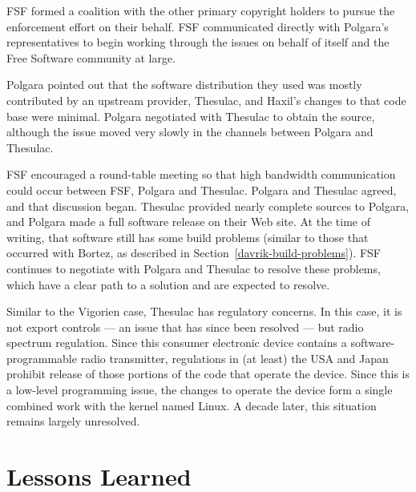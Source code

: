 FSF formed a coalition with the other primary copyright holders
to pursue the enforcement effort on their behalf. FSF communicated
directly with Polgara's representatives to begin working through the
issues on behalf of itself and the Free Software community at large.

Polgara pointed out that the software distribution they used was mostly
contributed by an upstream provider, Thesulac, and Haxil's changes to that
code base were minimal. Polgara negotiated with Thesulac to obtain the
source, although the issue moved very slowly in the channels between
Polgara and Thesulac.

FSF encouraged a round-table meeting so that high bandwidth communication
could occur between FSF, Polgara and Thesulac. Polgara and Thesulac
agreed, and that discussion began. Thesulac provided nearly complete
sources to Polgara, and Polgara made a full software release on their
Web site. At the time of writing, that software still has some build
problems (similar to those that occurred with Bortez, as described in
Section~\ref{davrik-build-problems}). FSF continues to negotiate with
Polgara and Thesulac to resolve these problems, which have a clear path to
a solution and are expected to resolve.

Similar to the Vigorien case, Thesulac has regulatory concerns. In this
case, it is not export controls --- an issue that has since been resolved
--- but radio spectrum regulation. Since this consumer electronic device
contains a software-programmable radio transmitter, regulations in (at
least) the USA and Japan prohibit release of those portions of the code
that operate the device. Since this is a low-level programming issue, the
changes to operate the device form a single combined work with the kernel named
Linux.  A decade later, this situation remains largely unresolved.

\section{Lessons Learned}

